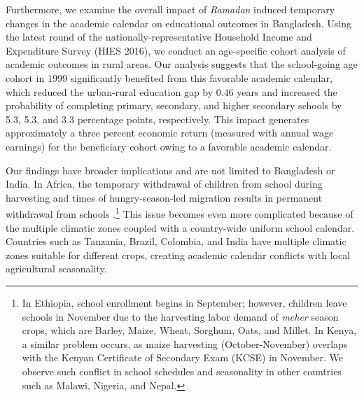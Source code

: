 \documentclass[12pt,letterpaper]{article}
\newcommand{\0}{\ensuremath{\mbox{\boldmath $0$}}}
\begin{document}
Furthermore, we examine the overall impact of \textit{Ramadan} induced temporary changes in the academic calendar on educational outcomes in Bangladesh. Using the latest round of the nationally-representative Household Income and Expenditure Survey (HIES 2016), we conduct an age-specific cohort analysis of academic outcomes in rural areas. Our analysis suggests that the school-going age cohort in 1999 significantly benefited from this favorable academic calendar, which reduced the urban-rural education gap by 0.46 years and increased the probability of completing primary, secondary, and higher secondary schools by 5.3, 5.3, and 3.3 percentage points, respectively. This impact generates approximately a three percent economic return (measured with annual wage earnings) for the beneficiary cohort owing to a favorable academic calendar.

Our findings have broader implications and are not limited to Bangladesh or India. In Africa, the temporary withdrawal of children from school during harvesting and times of hungry-season-led migration results in permanent withdrawal from schools \citep{ andvig1999child, Colclough2000, Hadley2010, kadzamira2003can, WorldBank1998}.\footnote{In Ethiopia, school enrollment begins in September; however, children leave schools in November due to the harvesting labor demand of \textit{meher} season crops, which are Barley, Maize, Wheat, Sorghum, Oats, and Millet. In Kenya, a similar problem occurs, as maize harvesting (October-November) overlaps with the Kenyan Certificate of Secondary Exam (KCSE) in November. We observe such conflict in school schedules and seasonality in other countries such as Malawi, Nigeria, and Nepal.} This issue becomes even more complicated because of the multiple climatic zones coupled with a country-wide uniform school calendar. Countries such as Tanzania, Brazil, Colombia, and India have multiple climatic zones suitable for different crops, creating academic calendar conflicts with local agricultural seasonality.

\end{document}
